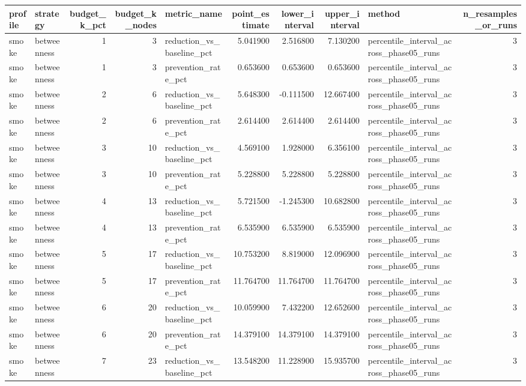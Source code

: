 \begin{tabular}{llrrlrrrlr}
\toprule
profile & strategy & budget\_k\_pct & budget\_k\_nodes & metric\_name & point\_estimate & lower\_interval & upper\_interval & method & n\_resamples\_or\_runs \\
\midrule
smoke & betweenness & 1 & 3 & reduction\_vs\_baseline\_pct & 5.041900 & 2.516800 & 7.130200 & percentile\_interval\_across\_phase05\_runs & 3 \\
smoke & betweenness & 1 & 3 & prevention\_rate\_pct & 0.653600 & 0.653600 & 0.653600 & percentile\_interval\_across\_phase05\_runs & 3 \\
smoke & betweenness & 2 & 6 & reduction\_vs\_baseline\_pct & 5.648300 & -0.111500 & 12.667400 & percentile\_interval\_across\_phase05\_runs & 3 \\
smoke & betweenness & 2 & 6 & prevention\_rate\_pct & 2.614400 & 2.614400 & 2.614400 & percentile\_interval\_across\_phase05\_runs & 3 \\
smoke & betweenness & 3 & 10 & reduction\_vs\_baseline\_pct & 4.569100 & 1.928000 & 6.356100 & percentile\_interval\_across\_phase05\_runs & 3 \\
smoke & betweenness & 3 & 10 & prevention\_rate\_pct & 5.228800 & 5.228800 & 5.228800 & percentile\_interval\_across\_phase05\_runs & 3 \\
smoke & betweenness & 4 & 13 & reduction\_vs\_baseline\_pct & 5.721500 & -1.245300 & 10.682800 & percentile\_interval\_across\_phase05\_runs & 3 \\
smoke & betweenness & 4 & 13 & prevention\_rate\_pct & 6.535900 & 6.535900 & 6.535900 & percentile\_interval\_across\_phase05\_runs & 3 \\
smoke & betweenness & 5 & 17 & reduction\_vs\_baseline\_pct & 10.753200 & 8.819000 & 12.096900 & percentile\_interval\_across\_phase05\_runs & 3 \\
smoke & betweenness & 5 & 17 & prevention\_rate\_pct & 11.764700 & 11.764700 & 11.764700 & percentile\_interval\_across\_phase05\_runs & 3 \\
smoke & betweenness & 6 & 20 & reduction\_vs\_baseline\_pct & 10.059900 & 7.432200 & 12.652600 & percentile\_interval\_across\_phase05\_runs & 3 \\
smoke & betweenness & 6 & 20 & prevention\_rate\_pct & 14.379100 & 14.379100 & 14.379100 & percentile\_interval\_across\_phase05\_runs & 3 \\
smoke & betweenness & 7 & 23 & reduction\_vs\_baseline\_pct & 13.548200 & 11.228900 & 15.935700 & percentile\_interval\_across\_phase05\_runs & 3 \\

\end{tabular}
